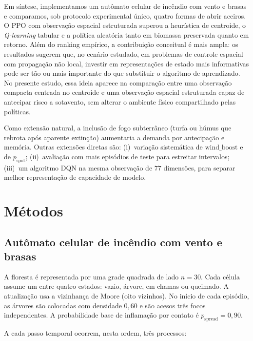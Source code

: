 \documentclass[11pt,a4paper]{article}
\begin{document}
Em síntese, implementamos um autômato celular de incêndio com vento e brasas e
comparamos, sob protocolo experimental único, quatro formas de abrir aceiros.
O PPO com observação espacial estruturada superou a heurística de centroide, o
\emph{Q-learning} tabular e a política aleatória tanto em biomassa preservada
quanto em retorno.
Além do ranking empírico, a contribuição conceitual é mais ampla: os resultados
sugerem que, no cenário estudado, em problemas de controle espacial com
propagação não local, investir em representações de estado mais informativas
pode ser tão ou mais importante do que substituir o algoritmo de aprendizado.
No presente estudo, essa ideia aparece na comparação entre uma observação
compacta centrada no centroide e uma observação espacial estruturada capaz de
antecipar risco a sotavento, sem alterar o ambiente físico compartilhado pelas
políticas.

Como extensão natural, a inclusão de fogo subterrâneo (turfa ou húmus que
rebrota após aparente extinção) aumentaria a demanda por antecipação e
memória.
Outras extensões diretas são: (i)~variação sistemática de
$\mathrm{wind\_boost}$ e de $p_{\mathrm{spot}}$; (ii)~avaliação com mais
episódios de teste para estreitar intervalos; (iii)~um algoritmo DQN na mesma
observação de $77$ dimensões, para separar melhor representação de
capacidade de modelo.

\FloatBarrier
\section{Métodos}
\label{sec:metodos}

\subsection{Autômato celular de incêndio com vento e brasas}
\label{sec:ca}

A floresta é representada por uma grade quadrada de lado $n=30$.
Cada célula assume um entre quatro estados: vazio, árvore, em chamas ou
queimado.
A atualização usa a vizinhança de Moore (oito vizinhos).
No início de cada episódio, as árvores são colocadas com densidade $0{,}60$ e
são acesos três focos independentes.
A probabilidade base de inflamação por contato é
$p_{\mathrm{spread}}=0{,}90$.

A cada passo temporal ocorrem, nesta ordem, três processos:
\end{document}
